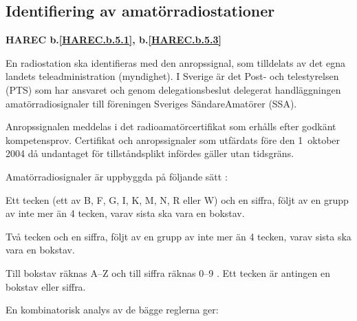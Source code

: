 \subsection{Identifiering av amatörradiostationer}
\textbf{
HAREC b.\ref{HAREC.b.5.1}\label{myHAREC.b.5.1},
 b.\ref{HAREC.b.5.3}\label{myHAREC.b.5.3}
}

En radiostation ska identifieras med den anropssignal, som
tilldelats av det egna landets teleadministration (myndighet). I Sverige
är det Post- och telestyrelsen (PTS) som har ansvaret och genom
delegationsbeslut delegerat handläggningen amatörradiosignaler till föreningen Sveriges SändareAmatörer (SSA).

Anropssignalen meddelas i det radioamatörcertifikat som erhålls efter godkänt kompetensprov. Certifikat och anropssignaler som utfärdats före den 1~oktober 2004 då undantaget för tillståndsplikt infördes gäller utan tidsgräns.

Amatörradiosignaler är uppbyggda på följande sätt \cite[§19.68, §19.69]{ITU-RR}:

Ett tecken (ett av B, F, G, I, K, M, N, R eller W) och en siffra, följt av en
grupp av inte mer än 4 tecken, varav sista ska vara en bokstav.

Två tecken och en siffra, följt av en grupp av inte mer än 4 tecken, varav
sista ska vara en bokstav.

Till bokstav räknas A--Z och till siffra räknas 0--9 \cite[§19.45]{ITU-RR}.
Ett tecken är antingen en bokstav eller siffra.

En kombinatorisk analys av de bägge reglerna ger:

